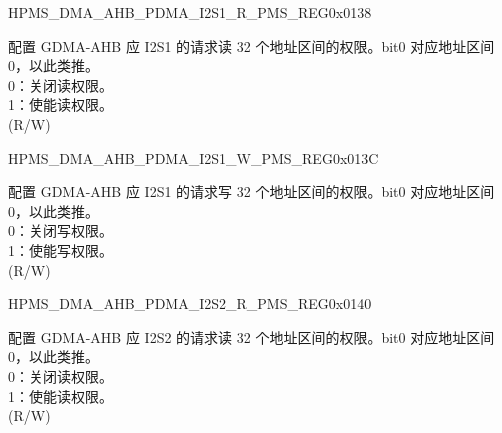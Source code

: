 \begin{register}{H}{PMS\_DMA\_AHB\_PDMA\_I2S1\_R\_PMS\_REG}{0x0138}\label{regdesc:PMSDMAAHBPDMAI2S1RPMSREG}
%
\regnewline%
\begin{regdesc}\begin{reglist}
\label{fielddesc:PMSDMAAHBPDMAI2S1RPMS}\item [PMS\_DMA\_AHB\_PDMA\_I2S1\_R\_PMS] 配置 GDMA-AHB 应 I2S1 的请求读 32 个地址区间的权限。bit0 对应地址区间 0，以此类推。\\
0：关闭读权限。\\
1：使能读权限。\\ (R/W)
\end{reglist}\end{regdesc}
\end{register}


\begin{register}{H}{PMS\_DMA\_AHB\_PDMA\_I2S1\_W\_PMS\_REG}{0x013C}\label{regdesc:PMSDMAAHBPDMAI2S1WPMSREG}
%
\regnewline%
\begin{regdesc}\begin{reglist}
\label{fielddesc:PMSDMAAHBPDMAI2S1WPMS}\item [PMS\_DMA\_AHB\_PDMA\_I2S1\_W\_PMS] 配置 GDMA-AHB 应 I2S1 的请求写 32 个地址区间的权限。bit0 对应地址区间 0，以此类推。\\
0：关闭写权限。\\
1：使能写权限。\\ (R/W)
\end{reglist}\end{regdesc}
\end{register}


\begin{register}{H}{PMS\_DMA\_AHB\_PDMA\_I2S2\_R\_PMS\_REG}{0x0140}\label{regdesc:PMSDMAAHBPDMAI2S2RPMSREG}
%
\regnewline%
\begin{regdesc}\begin{reglist}
\label{fielddesc:PMSDMAAHBPDMAI2S2RPMS}\item [PMS\_DMA\_AHB\_PDMA\_I2S2\_R\_PMS] 配置 GDMA-AHB 应 I2S2 的请求读 32 个地址区间的权限。bit0 对应地址区间 0，以此类推。\\
0：关闭读权限。\\
1：使能读权限。\\ (R/W)
\end{reglist}\end{regdesc}
\end{register}


